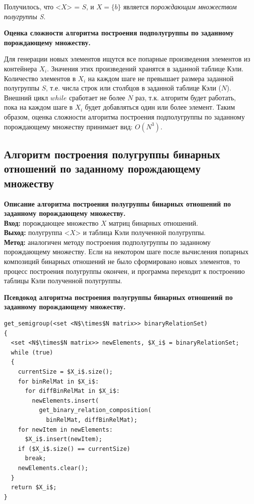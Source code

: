 \documentclass[spec, och, otchet, hidelinks]{SCWorks}
\newcommand{\tbf}[1]{\textbf{#1}}
\begin{document}
\par Получилось, что <$X$> = $S$, и $X = \{b\}$ является \textit{порождающим множеством
  полугруппы S}. \\

\par \tbf{Оценка сложности алгоритма построения подполугруппы по заданному
  порождающему множеству.}
\par Для генерации новых элементов ищутся все попарные произведения элементов из
контейнера $X_i$. Значения этих произведений хранятся в заданной таблице Кэли.
Количество элементов в $X_i$ на каждом шаге не превышает размера заданной
полугруппы $S$, т.е. числа строк или столбцов в заданной таблице Кэли ($N$). Внешний
цикл $while$ сработает не более $N$ раз, т.к. алгоритм будет работать, пока на
каждом шаге в $X_i$ будет добавляться один или более элемент. Таким образом,
оценка сложности алгоритма построения подполугруппы по заданному порождающему
множеству принимает вид: $O(N^3)$.

\newpage

\subsection{Алгоритм построения полугруппы бинарных отношений по заданному
  порождающему множеству}
\par \tbf{Описание алгоритма построения полугруппы бинарных отношений по
  заданному порождающему множеству.} \\
\tbf{Вход:} порождающее множество $X$ матриц бинарных отношений. \\
\tbf{Выход:} полугруппа <$X$> и таблица Кэли полученной полугруппы. \\
\tbf{Метод:} аналогичен методу построения подполугруппы по заданному
порождающему множеству. Если на некотором шаге после вычисления попарных композиций бинарных
отношений не было сформировано новых элементов, то процесс построения полугруппы
окончен, и программа переходит к построению таблицы Кэли полученной полугруппы.

\par \tbf{Псевдокод алгоритма построения полугруппы бинарных отношений по
  заданному порождающему множеству.}
\begin{lstlisting}[caption=Псевдокод алгоритма., mathescape]
get_semigroup(<set <N$\times$N matrix>> binaryRelationSet)
{
  <set <N$\times$N matrix>> newElements, $X_i$ = binaryRelationSet;
  while (true)
  {
    currentSize = $X_i$.size();
    for binRelMat in $X_i$:
      for diffBinRelMat in $X_i$:
        newElements.insert(
          get_binary_relation_composition(
            binRelMat, diffBinRelMat);
    for newItem in newElements:
      $X_i$.insert(newItem);
    if ($X_i$.size() == currentSize)
      break;
    newElements.clear();
  }
  return $X_i$;
}
\end{lstlisting}
\end{document}
